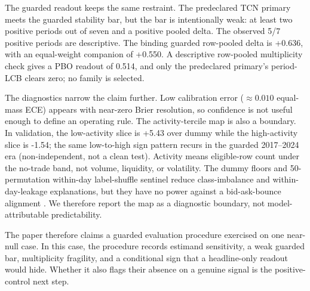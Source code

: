 The guarded readout keeps the same restraint. The predeclared TCN primary meets
the guarded stability bar, but the bar is intentionally weak: at least two
positive periods out of seven and a positive pooled delta. The observed 5/7
positive periods are descriptive. The binding guarded row-pooled delta is
+0.636\pp, with an equal-weight companion of +0.550\pp. A descriptive
row-pooled multiplicity check gives a PBO readout of 0.514, and only the
predeclared primary's period-LCB clears zero; no family is selected.

The diagnostics narrow the claim further. Low calibration error
(\(\approx 0.010\) equal-mass ECE) appears with near-zero Brier resolution, so
confidence is not useful enough to define an operating rule. The activity-tercile
map is also a boundary. In validation, the low-activity slice is +5.43\pp{} over
dummy while the high-activity slice is -1.54\pp; the same low-to-high sign
pattern recurs in the guarded 2017--2024 era (non-independent, not a clean
test). Activity means eligible-row count under the no-trade
band, not volume, liquidity, or volatility. The dummy floors and 50-permutation
within-day label-shuffle sentinel reduce class-imbalance and within-day-leakage
explanations, but they have no power against a bid-ask-bounce alignment
\cite{roll1984simple}. We therefore report the map as a diagnostic boundary, not
model-attributable predictability.

The paper therefore claims a guarded evaluation procedure exercised on one
near-null case. In this case, the procedure records estimand sensitivity, a weak
guarded bar, multiplicity fragility, and a conditional sign that a headline-only
readout would hide. Whether it also flags their absence on a genuine signal is
the positive-control next step.
